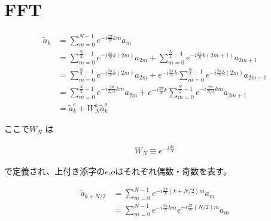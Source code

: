 \section{FFT}


\begin{align}
    \tilde{a}_k &= \sum_{m = 0}^{N - 1} e^{-i\frac{2\pi}{N} km} a_m \\
                &= \sum_{m = 0}^{\frac{N}{2} - 1} e^{-i\frac{2\pi}{N} k(2m)} a_{2m} 
                   + \sum_{m = 0}^{\frac{N}{2} - 1} e^{-i\frac{2\pi}{N} k(2m + 1)} a_{2m + 1} \\ 
                &= \sum_{m = 0}^{\frac{N}{2} - 1} e^{-i\frac{2\pi}{N} k(2m)} a_{2m} 
                   + e^{-i\frac{2\pi}{N}k} \sum_{m = 0}^{\frac{N}{2} - 1} e^{-i\frac{2\pi}{N} k(2m)} a_{2m + 1} \\ 
                &= \sum_{m = 0}^{\frac{N}{2} - 1} e^{-i\frac{2\pi}{N/2} km} a_{2m} 
                   + e^{-i\frac{2\pi}{N}k} \sum_{m = 0}^{\frac{N}{2} - 1} e^{-i\frac{2\pi}{N/2} km} a_{2m + 1} \\ 
                &= \tilde{a}_k^{e} + W_N^{k} \tilde{a}_k^{o}
\end{align}

ここで$W_N$ は

\begin{align*}
    W_N \equiv e^{-i\frac{2\pi}{N}} 
\end{align*}

で定義され、上付き添字の$e$,$o$はそれぞれ偶数・奇数を表す。


\begin{align}
    \tilde{a}_{k + N/2} &= \sum_{m = 0}^{N - 1} e^{-i\frac{2\pi}{N} (k + N/2)m} a_m \\
                        &= \sum_{m = 0}^{N - 1} e^{-i\frac{2\pi}{N}km} e^{-i\frac{2\pi}{N}(N/2)m}  a_m \\
\end{align}
